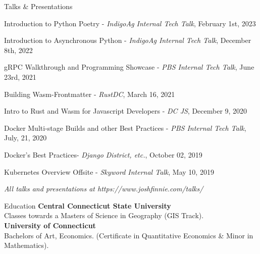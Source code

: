 \documentclass{bluefin_cv}
\begin{document}
\begin{bfcvSection}{Talks \& Presentations}
\begin{bfcvListSubsection}
\item Introduction to Python Poetry - \textsl{IndigoAg Internal Tech Talk}, February 1st, 2023
\item Introduction to Asynchronous Python - \textsl{IndigoAg Internal Tech Talk}, December 8th, 2022
\item gRPC Walkthrough and Programming Showcase - \textsl{PBS Internal Tech Talk}, June 23rd, 2021
\item Building Wasm-Frontmatter - \textsl{RustDC}, March 16, 2021
\item Intro to Rust and Wasm for Javascript Developers - \textsl{DC JS}, December 9, 2020
\item Docker Multi-stage Builds and other Best Practices - \textsl{PBS Internal Tech Talk}, July, 21, 2020
\item Docker's Best Practices- \textsl{Django District, etc.}, October 02, 2019
\item Kubernetes Overview Offsite - \textsl{Skyword Internal Talk}, May 10, 2019
\end{bfcvListSubsection}
\smallskip
\centerline{\textsl{All talks and presentations at https://www.joshfinnie.com/talks/}}
\end{bfcvSection}

\begin{bfcvSection}{Education}
{\bf Central Connecticut State University}
\\ Classes towards a Masters of Science in Geography (GIS Track).\hfill\\
{\bf University of Connecticut}
\\ Bachelors of Art, Economics. (Certificate in Quantitative Economics \& Minor in Mathematics).\hfill\\
\end{bfcvSection}

\end{document}
